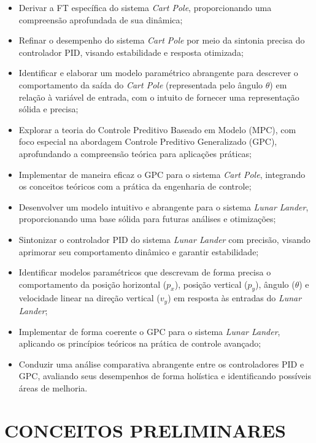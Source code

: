 \documentclass[12pt,           %
a4paper,                       %
openany,                       %
oneside,                       %
chapter=TITLE,                 %
english,                       %
spanish,                       %
brazil,                        %
sumario=tradicional]{abntex2}  %
\begin{document}
\begin{OnehalfSpace}
\begin{itemize}[itemsep=0.5em] %
    \item Derivar a FT específica do sistema \textit{Cart Pole}, proporcionando uma compreensão aprofundada de sua dinâmica;
    \item Refinar o desempenho do sistema \textit{Cart Pole} por meio da sintonia precisa do controlador PID, visando estabilidade e resposta otimizada;
    \item Identificar e elaborar um modelo paramétrico abrangente para descrever o comportamento da saída do \textit{Cart Pole} (representada pelo ângulo $\theta$) em relação à variável de entrada, com o intuito de fornecer uma representação sólida e precisa;
    \item Explorar a teoria do Controle Preditivo Baseado em Modelo (MPC), com foco especial na abordagem Controle Preditivo Generalizado (GPC), aprofundando a compreensão teórica para aplicações práticas;
    \item Implementar de maneira eficaz o GPC para o sistema \textit{Cart Pole}, integrando os conceitos teóricos com a prática da engenharia de controle;
    \item Desenvolver um modelo intuitivo e abrangente para o sistema \textit{Lunar Lander}, proporcionando uma base sólida para futuras análises e otimizações;
    \item Sintonizar o controlador PID do sistema \textit{Lunar Lander} com precisão, visando aprimorar seu comportamento dinâmico e garantir estabilidade;
	\item Identificar modelos paramétricos que descrevam de forma precisa o comportamento da posição horizontal ($p_x$), posição vertical ($p_y$), ângulo ($\theta$) e velocidade linear na direção vertical ($v_y$) em resposta às entradas do \textit{Lunar Lander};
    \item Implementar de forma coerente o GPC para o sistema \textit{Lunar Lander}, aplicando os princípios teóricos na prática de controle avançado;
    \item Conduzir uma análise comparativa abrangente entre os controladores PID e GPC, avaliando seus desempenhos de forma holística e identificando possíveis áreas de melhoria.
\end{itemize}


{\let\clearpage\relax\par \chapter{CONCEITOS PRELIMINARES}}  %
\label{ch:conceitosPreliminares}           %
																		

\end{OnehalfSpace}
\end{document}
